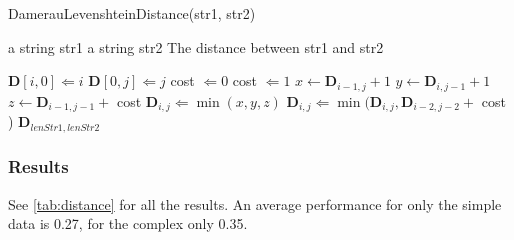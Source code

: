\begin{algorithm}
\caption{DamerauLevenshteinDistance(str1, str2)}
\label{dameraulevenshtein}
\begin{algorithmic}
   \REQUIRE a string str1
   \REQUIRE a string str2
   \ENSURE The distance between str1 and str2

   \medskip

       \STATE $\mathbf{D}[i, 0] \Leftarrow i$
   \ENDFOR
       \STATE $\mathbf{D}[0, j] \Leftarrow j$
   \ENDFOR
				\STATE cost $\Leftarrow 0$
            \ELSE
				\STATE cost $\Leftarrow 1$
			\ENDIF
			\STATE $x \leftarrow \mathbf{D}_{i-1, j  } + 1$ %
			\STATE $y \leftarrow \mathbf{D}_{i  , j-1} + 1$ %
            \STATE $z \leftarrow \mathbf{D}_{i-1, j-1} + $ cost %
            \STATE $\mathbf{D}_{i, j} \Leftarrow \min(x, y, z)$
				\STATE $\mathbf{D}_{i, j} \Leftarrow \min(
                	\mathbf{D}_{i, j},
                    \mathbf{D}_{i-2, j-2} + $ cost  %
                )
			\ENDIF
		\ENDFOR
	\ENDFOR
   \RETURN $\mathbf{D}_{lenStr1, lenStr2}$

\end{algorithmic}
\end{algorithm}
	
\subsubsection{Results}
See \autoref{tab:distance} for all the results. An average performance for only the simple data is 0.27, for the complex only  0.35.


